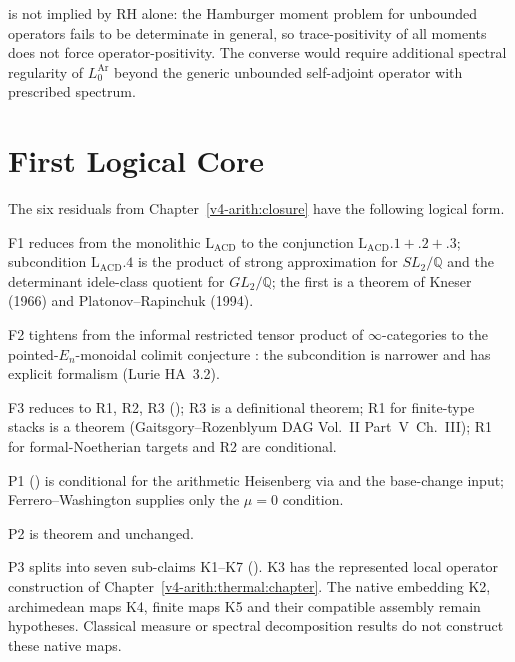 \begin{remark}
\label{v4-arith:sw:rem:VB-converse-finer}
 is not implied by RH alone:
the Hamburger moment problem for unbounded operators fails to be
determinate in general, so trace-positivity of all moments does
not force operator-positivity. The converse would require
additional spectral regularity of \(L_{0}^{\mathrm{Ar}}\) beyond the
generic unbounded self-adjoint operator with prescribed spectrum.
\end{remark}

\section{First Logical Core}
\label{v4-arith:sw:post-list}

The six residuals from Chapter~\ref{v4-arith:closure} have the
following logical form.

F1 reduces from the monolithic \(\mathrm{L}_{\mathrm{ACD}}\) to the
conjunction \(\mathrm{L}_{\mathrm{ACD}}.1+.2+.3\); subcondition
\(\mathrm{L}_{\mathrm{ACD}}.4\) is the product of strong approximation
for \(SL_{2}/\mathbb{Q}\) and the determinant idele-class quotient for
\(GL_{2}/\mathbb{Q}\); the first is a theorem of Kneser (1966) and
Platonov--Rapinchuk
(1994).

F2 tightens from the informal restricted tensor product of
\(\infty\)-categories to the pointed-\(E_{n}\)-monoidal colimit
conjecture : the subcondition is
narrower and has explicit formalism (Lurie HA~3.2).

F3 reduces to R1, R2, R3 ();
R3 is a definitional theorem; R1 for finite-type stacks is a theorem
(Gaitsgory--Rozenblyum DAG Vol.~II Part~V~Ch.~III); R1 for
formal-Noetherian targets and R2 are conditional.

P1 () is conditional for the
arithmetic Heisenberg via
 and the base-change input;
Ferrero--Washington supplies only the \(\mu=0\) condition.

P2 is theorem and unchanged.

P3 splits into seven sub-claims K1--K7
(). K3 has the represented local
operator construction of Chapter~\ref{v4-arith:thermal:chapter}.
The native embedding K2, archimedean maps K4, finite maps K5 and their
compatible assembly remain hypotheses. Classical measure or spectral
decomposition results do not construct these native maps.

